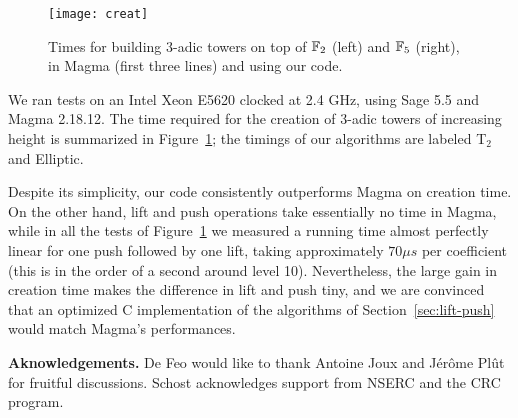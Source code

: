 \documentclass{sig-alternate}
\begin{document}
\begin{figure}
  \centering
  \texttt{[image: creat]}
  \caption{Times for building $3$-adic towers on top of $\mathbb{F}_2$ (left)
    and $\mathbb{F}_5$ (right), in Magma (first three lines) and using our
    code.}
  \label{fig:build}
\end{figure}

We ran tests on an Intel Xeon E5620 clocked at 2.4 GHz, using Sage 5.5
and Magma 2.18.12. The time required for the creation of $3$-adic
towers of increasing height is summarized in
Figure~\ref{fig:build}; the timings of our algorithms are labeled 
T$_2$ and Elliptic.

Despite its simplicity, our code consistently outperforms Magma on
creation time. On the other hand, lift and push operations take
essentially no time in Magma, while in all the tests of
Figure~\ref{fig:build} we measured a running time almost perfectly
linear for one push followed by one lift, taking approximately $70\mu
s$ per coefficient (this is in the order of a second around level
10). Nevertheless, the large gain in creation time makes the
difference in lift and push tiny, and we are convinced that an
optimized C implementation of the algorithms of
Section~\ref{sec:lift-push} would match Magma's performances.


\bigskip\noindent \textbf{Aknowledgements.}  De Feo would like to thank Antoine
Joux and J\'er\^ome Pl\^ut for fruitful discussions. Schost acknowledges
support from NSERC and the CRC program.

\scriptsize


\end{document}

